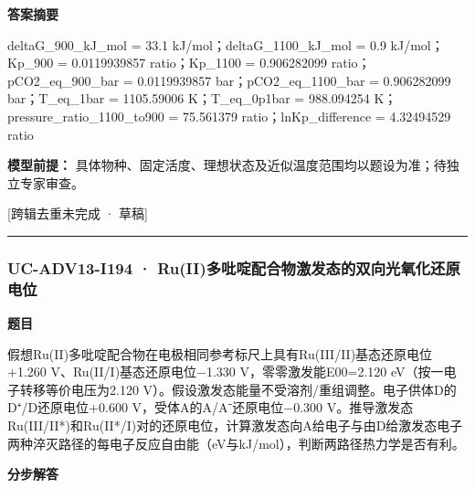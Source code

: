 \documentclass[UTF8,11pt,a4paper]{ctexart}
\begin{document}
\noindent\textbf{答案摘要}\par
deltaG\_900\_kJ\_mol = 33.1 kJ/mol；deltaG\_1100\_kJ\_mol = 0.9 kJ/mol；Kp\_900 = 0.0119939857 ratio；Kp\_1100 = 0.906282099 ratio；pCO2\_eq\_900\_bar = 0.0119939857 bar；pCO2\_eq\_1100\_bar = 0.906282099 bar；T\_eq\_1bar = 1105.59006 K；T\_eq\_0p1bar = 988.094254 K；pressure\_ratio\_1100\_to900 = 75.561379 ratio；lnKp\_difference = 4.32494529 ratio\par
\noindent\textbf{模型前提：}
具体物种、固定活度、理想状态及近似温度范围均以题设为准；待独立专家审查。\par
\noindent\textcolor{red!65!black}{[跨辑去重未完成 · 草稿]} \par
\medskip\hrule\medskip
{}
\subsubsection*{UC-ADV13-I194 · Ru(II)多吡啶配合物激发态的双向光氧化还原电位}
\noindent\textbf{题目}\par
假想Ru(II)多吡啶配合物在电极相同参考标尺上具有Ru(III/II)基态还原电位+1.260 V、Ru(II/I)基态还原电位−1.330 V，零零激发能E00=2.120 eV（按一电子转移等价电压为2.120 V）。假设激发态能量不受溶剂/重组调整。电子供体D的D⁺/D还原电位+0.600 V，受体A的A/A⁻还原电位−0.300 V。推导激发态Ru(III/II*)和Ru(II*/I)对的还原电位，计算激发态向A给电子与由D给激发态电子两种淬灭路径的每电子反应自由能（eV与kJ/mol），判断两路径热力学是否有利。\par
\medskip\noindent\textbf{分步解答}
\end{document}
